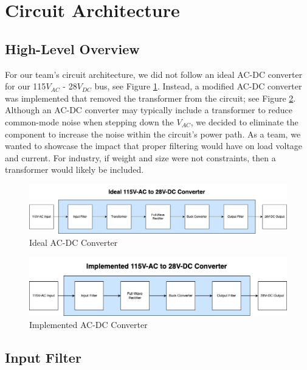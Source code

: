 \documentclass[conference]{IEEEtran}
\begin{document}
\section{Circuit Architecture}

\subsection{High-Level Overview}

For our team's circuit architecture, we did not follow an ideal AC-DC converter for our 115$V_{AC}$ - 28$V_{DC}$ bus, see Figure \ref{fig:ac_dc_converter_ideal_diagram}. Instead, a modified AC-DC converter was implemented that removed the transformer from the circuit; see Figure \ref{fig:ac_dc_converter_implemented_diagram}. Although an AC-DC converter may typically include a transformer to reduce common-mode noise when stepping down the $V_{AC}$, we decided to eliminate the component to increase the noise within the circuit's power path. As a team, we wanted to showcase the impact that proper filtering would have on load voltage and current. For industry, if weight and size were not constraints, then a transformer would likely be included.

\begin{figure}[htbp]
    \centering
    \includegraphics[width=1.0\linewidth]{ac_dc_converter_ideal.png}
    \caption{Ideal AC-DC Converter}
    \label{fig:ac_dc_converter_ideal_diagram}
\end{figure}

\begin{figure}[h]
    \centering
    \includegraphics[width=1.0\linewidth]{ac_dc_converter_implemented.png}
    \caption{Implemented AC-DC Converter}
    \label{fig:ac_dc_converter_implemented_diagram}
\end{figure}

\subsection{Input Filter}
\end{document}
